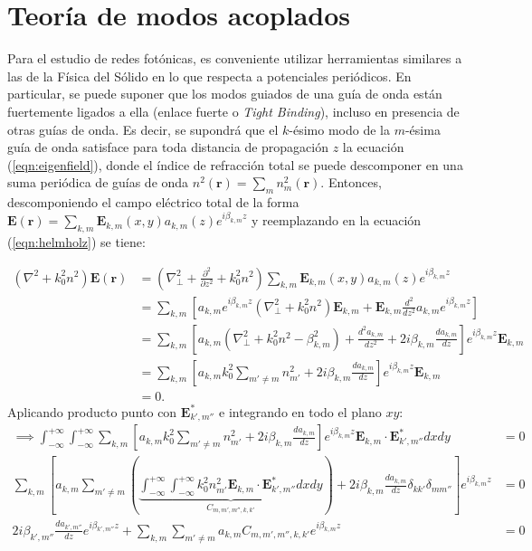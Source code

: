 \section{Teoría de modos acoplados}
	Para el estudio de redes fotónicas, es conveniente utilizar herramientas similares a las de la Física del Sólido en lo que respecta a potenciales periódicos. En particular, se puede suponer que los modos guiados de una guía de onda están fuertemente ligados a ella (enlace fuerte o \textit{Tight Binding}), incluso en presencia de otras guías de onda. Es decir, se supondrá que el $k$-ésimo modo de la $m$-ésima guía de onda satisface para toda distancia de propagación $z$ la ecuación (\ref{eqn:eigenfield}), donde el índice de refracción total se puede descomponer en una suma periódica de guías de onda $n^2(\textbf{r}) = \sum_{m} n^2_m(\textbf{r})$. Entonces, descomponiendo el campo eléctrico total de la forma $\textbf{E}(\textbf{r}) = \sum_{k, m} \textbf{E}_{k, m}(x, y) a_{k, m}(z) e^{i\beta_{k, m} z}$ y reemplazando en la ecuación (\ref{eqn:helmholz}) se tiene:

\begin{align}
	(\nabla^2  + k_0^2n^2) \textbf{E}(\textbf{r}) &= \left(\nabla_\perp^2 + \frac{\partial^2}{\partial z^2} + k_0^2n^2 \right)\sum_{k, m} \textbf{E}_{k, m}(x, y) a_{k, m}(z) e^{i\beta_{k, m} z}
	\nonumber
	\\
	&= \sum_{k, m} \left[a_{k, m} e^{i\beta_{k, m} z} \left(\nabla_\perp^2 +k_0^2n^2 \right)\textbf{E}_{k, m} + \textbf{E}_{k, m}\frac{d^2}{d z^2}a_{k, m} e^{i\beta_{k, m} z}\right]
	\nonumber	
	\\
	&= \sum_{k, m} \left[a_{k, m}  \left(\nabla_\perp^2 +k_0^2n^2 -\beta_{k,m}^2 \right) + \frac{d^2 a_{k, m}}{d z^2}  +2i\beta_{k,m}\frac{d a_{k, m}}{d z} \right]e^{i\beta_{k, m} z}\textbf{E}_{k, m}
		\nonumber	
	\\
	&= \sum_{k, m} \left[a_{k, m}  k_0^2\sum_{m'\neq m} n^2_{m'} +2i\beta_{k,m}\frac{d a_{k, m}}{d z} \right]e^{i\beta_{k, m} z}\textbf{E}_{k, m}
	\nonumber	
	\\
	&= 0.
	\nonumber	
\end{align}
Aplicando producto punto con $\textbf{E}_{k', m''}^*$ e integrando en todo el plano $xy$:
\begin{align}
	\implies 
	  \int_{-\infty}^{+\infty}\int_{-\infty}^{+\infty} \sum_{k, m} \left[a_{k, m}  k_0^2\sum_{m'\neq m} n^2_{m'}  +2i\beta_{k,m}\frac{d a_{k, m}}{d z} \right]e^{i\beta_{k, m} z}\textbf{E}_{k, m} \cdot \textbf{E}_{k', m''}^* dxdy &= 0
	  \nonumber
	  \\
	  \sum_{k, m} \left[a_{k, m}  \sum_{m'\neq m}\left( \underbrace{\int_{-\infty}^{+\infty}\int_{-\infty}^{+\infty} k_0^2n^2_{m'} \textbf{E}_{k, m} \cdot \textbf{E}_{k', m''}^* dxdy}_{C_{m, m', m'', k, k'}}\right) +2i\beta_{k,m}\frac{d a_{k, m}}{d z}\delta_{kk'}\delta_{mm''} \right]e^{i\beta_{k, m} z} &= 0
	  	  \nonumber
	  \\
2i\beta_{k',m''}\frac{d a_{k', m''}}{d z}e^{i\beta_{k', m''} z} +	  \sum_{k, m} \sum_{m'\neq m}  a_{k, m}  C_{m, m', m'', k, k'}e^{i\beta_{k, m} z}   &= 0
	\label{eqn:CMT1}
\end{align}

